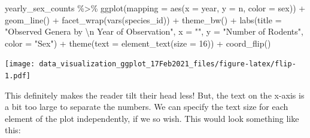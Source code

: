 \documentclass[
]{article}
\newenvironment{Shaded}{\begin{snugshade}}{\end{snugshade}}
\newcommand{\AttributeTok}[1]{\textcolor[rgb]{0.77,0.63,0.00}{#1}}
\newcommand{\DecValTok}[1]{\textcolor[rgb]{0.00,0.00,0.81}{#1}}
\newcommand{\FunctionTok}[1]{\textcolor[rgb]{0.00,0.00,0.00}{#1}}
\newcommand{\NormalTok}[1]{#1}
\newcommand{\SpecialCharTok}[1]{\textcolor[rgb]{0.00,0.00,0.00}{#1}}
\newcommand{\StringTok}[1]{\textcolor[rgb]{0.31,0.60,0.02}{#1}}
\begin{document}
\begin{Shaded}
\begin{Highlighting}[]
\NormalTok{yearly\_sex\_counts }\SpecialCharTok{\%\textgreater{}\%} 
  \FunctionTok{ggplot}\NormalTok{(}\AttributeTok{mapping =} \FunctionTok{aes}\NormalTok{(}\AttributeTok{x =}\NormalTok{ year, }\AttributeTok{y =}\NormalTok{ n, }\AttributeTok{color =}\NormalTok{ sex)) }\SpecialCharTok{+}
  \FunctionTok{geom\_line}\NormalTok{() }\SpecialCharTok{+}
  \FunctionTok{facet\_wrap}\NormalTok{(}\FunctionTok{vars}\NormalTok{(species\_id)) }\SpecialCharTok{+}
  \FunctionTok{theme\_bw}\NormalTok{() }\SpecialCharTok{+}
  \FunctionTok{labs}\NormalTok{(}\AttributeTok{title =} \StringTok{"Observed Genera by }\SpecialCharTok{\textbackslash{}n}\StringTok{ Year of Observation"}\NormalTok{,}
       \AttributeTok{x =} \StringTok{""}\NormalTok{,}
       \AttributeTok{y =} \StringTok{"Number of Rodents"}\NormalTok{, }
       \AttributeTok{color =} \StringTok{"Sex"}\NormalTok{) }\SpecialCharTok{+}
  \FunctionTok{theme}\NormalTok{(}\AttributeTok{text =} \FunctionTok{element\_text}\NormalTok{(}\AttributeTok{size =} \DecValTok{16}\NormalTok{)) }\SpecialCharTok{+} 
  \FunctionTok{coord\_flip}\NormalTok{()}
\end{Highlighting}
\end{Shaded}

\texttt{[image: data\_visualization\_ggplot\_17Feb2021\_files/figure-latex/flip-1.pdf]}

This definitely makes the reader tilt their head less! But, the text on
the x-axis is a bit too large to separate the numbers. We can specify
the text size for each element of the plot independently, if we so wish.
This would look something like this:
\end{document}
